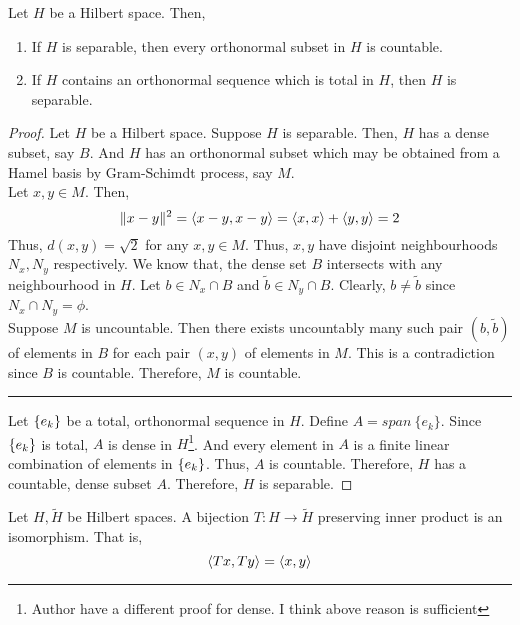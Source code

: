 \begin{theorem}
	Let $H$ be a Hilbert space.
	Then,
	\begin{enumerate}
		\item If $H$ is separable, then every orthonormal subset in $H$ is countable.
		\item If $H$ contains an orthonormal sequence which is total in $H$, then $H$ is separable.
	\end{enumerate}
\end{theorem}
\begin{proof}
	Let $H$ be a Hilbert space.
	Suppose $H$ is separable.
	Then, $H$ has a dense subset, say $B$.
	And $H$ has an orthonormal subset which may be obtained from a Hamel basis by Gram-Schimdt process, say $M$.\\
	
	Let $x,y \in M$.
	Then,
	\[ \|x-y\|^2 = \left\langle x-y,x-y \right\rangle = \left\langle x,x \right\rangle + \left\langle y,y \right\rangle = 2 \]
	Thus, $d(x,y) = \sqrt{2}$ for any $x,y \in M$.
	Thus, $x,y$ have disjoint neighbourhoods $N_x,N_y$ respectively.
	We know that, the dense set $B$ intersects with any neighbourhood in $H$.
	Let $b \in N_x \cap B$ and $\tilde{b} \in N_y \cap B$.
	Clearly, $b \ne \tilde{b}$ since $N_x \cap N_y = \phi$.\\

	Suppose $M$ is uncountable.
	Then there exists uncountably many such pair $(b,\tilde{b})$ of elements in $B$ for each pair $(x,y)$ of elements in $M$.
	This is a contradiction since $B$ is countable.
	Therefore, $M$ is countable.\\

	\hrule \vspace{1em}

	Let $\left\{e_k\right\}$ be a total, orthonormal sequence in $H$.
	Define $A = span\ \{e_k\}$.
	Since $\left\{e_k\right\}$ is total, $A$ is dense in $H$\dag\footnote{
		Author have a different proof for dense.
		I think above reason is sufficient}.
	And every element in $A$ is a finite linear combination of elements in $\left\{e_k\right\}$.
	Thus, $A$ is countable.
	Therefore, $H$ has a countable, dense subset $A$.
	Therefore, $H$ is separable.
\end{proof}

\begin{definition}[isomorphism]
	Let $H,\tilde{H}$ be Hilbert spaces.
	A bijection $T : H \to \tilde{H}$ preserving inner product is an isomorphism.
	That is, 
	\[ \left\langle Tx,Ty \right\rangle = \left\langle x,y \right\rangle \]
\end{definition}

